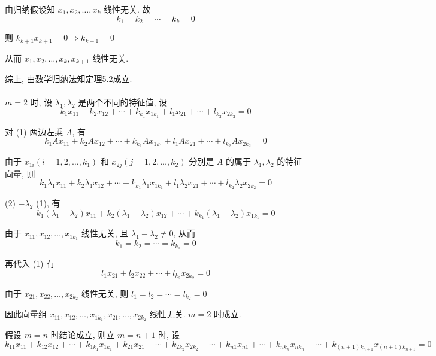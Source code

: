          由归纳假设知 \( x_{1}, x_{2}, \dots, x_{k} \) 线性无关. 故
         \[ k_{1} = k_{2} = \cdots = k_{k} = 0 \]

         则 \( k_{k+1}x_{k+1} = 0 \Rightarrow k_{k+1} = 0 \)

         从而 \( x_{1}, x_{2}, \dots, x_{k}, x_{k+1} \) 线性无关.

         综上, 由数学归纳法知定理5.2成立.


     \paragraph{} %
         \( m=2 \) 时, 设 \( \lambda_{1}, \lambda_{2} \) 是两个不同的特征值, 设
         \[ k_{1}x_{11} + k_{2}x_{12} + \cdots + k_{k_{1}}x_{1k_{1}} + l_{1}x_{21} + \cdots + l_{k_{2}}x_{2k_{2}} = 0 \tag{1} \]

         对 (1) 两边左乘 \( A \), 有
         \[ k_{1}A x_{11} + k_{2}A x_{12} + \cdots + k_{k_{1}}A x_{1k_{1}} + l_{1}A x_{21} + \cdots + l_{k_{2}}A x_{2k_{2}} = 0 \]

         由于 \( x_{1i} (i=1,2,\dots,k_{1}) \) 和 \( x_{2j} (j=1,2,\dots,k_{2}) \) 分别是 \( A \) 的属于 \( \lambda_{1}, \lambda_{2} \) 的特征向量, 则
         \[ k_{1}\lambda_{1}x_{11} + k_{2}\lambda_{1}x_{12} + \cdots + k_{k_{1}}\lambda_{1}x_{1k_{1}} + l_{1}\lambda_{2}x_{21} + \cdots + l_{k_{2}}\lambda_{2}x_{2k_{2}} = 0 \tag{2} \]

         (2) \( - \lambda_{2} \) (1), 有
         \[ k_{1}(\lambda_{1} - \lambda_{2})x_{11} + k_{2}(\lambda_{1} - \lambda_{2})x_{12} + \cdots + k_{k_{1}}(\lambda_{1} - \lambda_{2})x_{1k_{1}} = 0 \]

         由于 \( x_{11}, x_{12}, \dots, x_{1k_{1}} \) 线性无关, 且 \( \lambda_{1} - \lambda_{2} \neq 0 \), 从而
         \[ k_{1} = k_{2} = \cdots = k_{k_{1}} = 0 \]

         再代入 (1) 有
         \[ l_{1}x_{21} + l_{2}x_{22} + \cdots + l_{k_{2}}x_{2k_{2}} = 0 \]

         由于 \( x_{21}, x_{22}, \dots, x_{2k_{2}} \) 线性无关, 则 \( l_{1} = l_{2} = \cdots = l_{k_{2}} = 0 \)

         因此向量组 \( x_{11}, x_{12}, \dots, x_{1k_{1}}, x_{21}, \dots, x_{2k_{2}} \) 线性无关. \( m=2 \) 时成立.

         假设 \( m=n \) 时结论成立, 则立 \( m=n+1 \) 时, 设
         \[ k_{11}x_{11} + k_{12}x_{12} + \cdots + k_{1k_{1}}x_{1k_{1}} + k_{21}x_{21} + \cdots + k_{2k_2}x_{2k_{2}} + \cdots + k_{n1}x_{n1} + \cdots + k_{n k_n}x_{n k_n} + \cdots + k_{(n+1)k_{n+1}}x_{(n+1)k_{n+1}} = 0 \]

